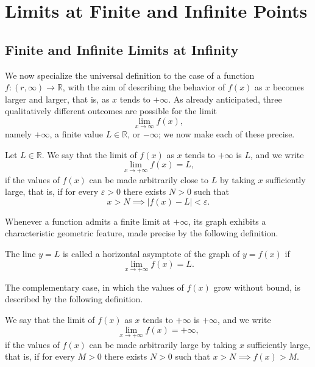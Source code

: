 \section{Limits at Finite and Infinite Points}

\subsection{Finite and Infinite Limits at Infinity}


We now specialize the universal definition to the case of a function $f : (r, \infty) \to \mathbb{R}$, with the aim of describing the behavior of $f(x)$ as $x$ becomes larger and larger, that is, as $x$ tends to $+\infty$. As already anticipated, three qualitatively different outcomes are possible for the limit \[
\lim_{x \to \infty} f(x),
\] namely $+\infty$, a finite value $L \in \mathbb{R}$, or $-\infty$; we now make each of these precise.

\begin{definition}
Let $L \in \mathbb{R}$. We say that the limit of $f(x)$ as $x$ tends to $+\infty$ is $L$, and we write \[
\lim_{x \to +\infty} f(x) = L,
\] if the values of $f(x)$ can be made arbitrarily close to $L$ by taking $x$ sufficiently large, that is, if for every $\varepsilon > 0$ there exists $N > 0$ such that
\[
x > N \implies |f(x) - L| < \varepsilon.
\]

\end{definition}

Whenever a function admits a finite limit at $+\infty$, its graph exhibits a characteristic geometric feature, made precise by the following definition.

\begin{definition}
The line $y = L$ is called a horizontal asymptote of the graph of $y = f(x)$ if
\[
\lim_{x \to +\infty} f(x) = L.
\]

\end{definition}

The complementary case, in which the values of $f(x)$ grow without bound, is described by the following definition.

\begin{definition}
We say that the limit of $f(x)$ as $x$ tends to $+\infty$ is $+\infty$, and we write \[
\lim_{x \to +\infty} f(x) = +\infty,
\] if the values of $f(x)$ can be made arbitrarily large by taking $x$ sufficiently large, that is, if for every $M > 0$ there exists $N > 0$ such that $x > N \implies f(x) > M$.
\end{definition}

